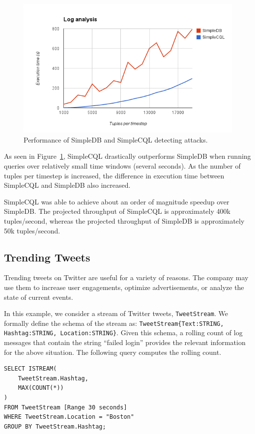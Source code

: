 \documentclass[a4paper, 10pt, conference]{IEEEconf}
\begin{document}
\begin{figure}[h!]
    \centering
    \centerline{\includegraphics[totalheight=5cm]{attack.png}}
    \caption{Performance of SimpleDB and SimpleCQL detecting attacks.}
    \label{fig:attack}
\end{figure}

As seen in Figure~\ref{fig:attack}, SimpleCQL drastically outperforms SimpleDB when running queries over relatively small time windows (several seconds).  As the number of tuples per timestep is increased, the difference in execution time between SimpleCQL and SimpleDB also increased.  

SimpleCQL was able to achieve about an order of magnitude speedup over SimpleDB.  The projected throughput of SimpleCQL is approximately 400k tuples/second, whereas the projected throughput of SimpleDB is approximately 50k tuples/second.

\subsection{Trending Tweets}
Trending tweets on Twitter are useful for a variety of reasons.  The company may use them to increase user engagements, optimize advertisements, or analyze the state of current events.  

In this example, we consider a stream of Twitter tweets, \texttt{TweetStream}. We formally define the schema of the stream as: \texttt{TweetStream\{Text:STRING, Hashtag:STRING, Location:STRING\}}.  Given this schema, a rolling count of log messages that contain the string ``failed login'' provides the relevant information for the above situation.  The following query computes the rolling count.

\begin{lstlisting}
SELECT ISTREAM(
    TweetStream.Hashtag,
    MAX(COUNT(*))
)
FROM TweetStream [Range 30 seconds]
WHERE TweetStream.Location = "Boston"
GROUP BY TweetStream.Hashtag;
\end{lstlisting}
\begingroup
{}
\endgroup
\end{document}

